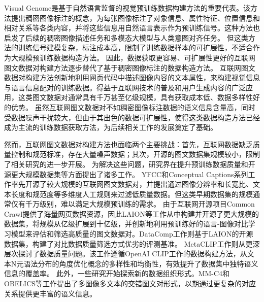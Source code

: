 Visual Genome\cite{krishna2017visual}是基于自然语言监督的视觉预训练数据构建方法的重要代表。该方法提出稠密图像标注的概念，为每张图像标注了对象信息、属性特征、位置信息和相对关系等各类内容，并将这些信息用自然语言表示作为预训练信号。这种方法也启发了后续的稠密图像描述任务和多模态大模型与人类意图对齐任务\cite{imageinwords,flexcap,densecap}。
但这类方法的训练信号建模复杂，标注成本高，限制了训练数据样本的可扩展性，不适合作为大规模预训练数据构造方法。
因此，数据获取更容易、可扩展性更好的互联网图文数据对构建方法\cite{YFCC100M, sharma-etal-2018-conceptual, changpinyo2021conceptual}逐步替代了基于稠密图像标注的数据构造方法。
互联网图文数据对构建方法创新地利用网页代码中描述图像内容的文本属性，来构建视觉信息与语言信息配对的训练数据。得益于互联网技术的普及和用户生成内容的广泛应用，这类图文数据对通常具有千万甚至亿级规模，具有获取成本低、数据多样性好的优势。
虽然互联网图文数据对不如稠密图像标注数据的语义信息含量高，同时受数据噪声干扰较大，但由于其出色的数据可扩展性，使得这类数据构造方法已经成为主流的训练数据获取方法，为后续相关工作的发展奠定了基础。

然而，互联网图文数据对构建方法也面临两个主要挑战：首先，互联网数据缺乏质量控制和规范标准，存在大量噪声数据；其次，开源的图文数据集规模较小，限制了相关研究的进一步开展。
为解决这些问题，研究界在提升预训练数据质量和开源更大规模数据集等方面提出了诸多工作。
YFCC\cite{YFCC100M}和Conceptual Captions系列\cite{sharma-etal-2018-conceptual,changpinyo2021conceptual}工作率先开源了较大规模的互联网图文数据对，并提出通过图像分辨率和长宽比、文本长度和规范度等多维度人工规则来过滤低质量数据。但这类早期数据集的规模通常仅有千万级别，难以满足大规模预训练的需求。
由于互联网开源项目Common Crawl\cite{cc}提供了海量网页数据资源，因此LAION等工作\cite{schuhmann2021laion400m,schuhmann2022laion5bopenlargescaledataset,COYO-700m}从中构建并开源了更大规模的数据集，将规模从亿级扩展到十亿级，并创新地利用预训练好的语言-图像对比学习模型来评估和筛选高质量的图文数据对。DataComp工作\cite{datacomp}则基于LAION的开源数据集，构建了对比数据质量筛选方式优劣的评测基准。
MetaCLIP\cite{xu2024demystifying}工作则从更深层次探讨了数据质量问题。该工作遵循OpenAI CLIP工作\cite{radford2021learning}的数据构建方法，从文本N元语法分布的角度优化概念的多样性和均衡性，有效提升了数据集中独特语义信息的覆盖率。
此外，一些研究开始探索新的数据组织形式。MM-C4\cite{MM-C4}和OBELICS\cite{OBELICS}等工作提出了多图像多文本的交错图文对形式，以期通过更复杂的对应关系提供更丰富的语义信息。

